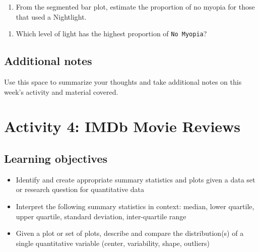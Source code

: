 \documentclass[
]{report}
\providecommand{\tightlist}{%
  \setlength{\itemsep}{0pt}\setlength{\parskip}{0pt}}
\begin{document}
\vspace{1.5in}

\begin{enumerate}
\def\labelenumi{\arabic{enumi}.}
\setcounter{enumi}{4}
\tightlist
\item
  From the segmented bar plot, estimate the proportion of no myopia for those that used a Nightlight.
\end{enumerate}

\vspace{0.5in}

\begin{enumerate}
\def\labelenumi{\arabic{enumi}.}
\setcounter{enumi}{5}
\tightlist
\item
  Which level of light has the highest proportion of \texttt{No\ Myopia}?
\end{enumerate}

\vspace{0.5in}

\newpage

\hypertarget{additional-notes}{%
\section{Additional notes}\label{additional-notes}}

Use this space to summarize your thoughts and take additional notes on this week's activity and material covered.

\hypertarget{activity-4-imdb-movie-reviews}{%
\chapter{Activity 4: IMDb Movie Reviews}\label{activity-4-imdb-movie-reviews}}

\hypertarget{learning-objectives}{%
\section{Learning objectives}\label{learning-objectives}}

\begin{itemize}
\item
  Identify and create appropriate summary statistics and plots
  given a data set or research question for quantitative data
\item
  Interpret the following summary statistics in context:
  median, lower quartile, upper quartile,
  standard deviation, inter-quartile range
\item
  Given a plot or set of plots, describe and compare the distribution(s)
  of a single quantitative variable
  (center, variability, shape, outliers)
\end{itemize}
\end{document}
